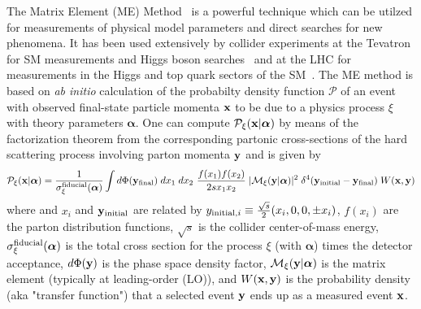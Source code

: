 The Matrix Element (ME)
Method~\cite{Kondo:1988yd,Fiedler:2010sg,2011arXiv1101.2259V,Elahi:2017ppe}
is a powerful technique which can be utilzed for measurements of
physical model parameters and direct searches for new phenomena. It
has been used extensively by collider experiments at the Tevatron for
SM measurements and Higgs boson
searches~\cite{Abazov:2004cs,Abulencia:2006ry,Aaltonen:2008mv,Aaltonen:2010cm,Abazov:2009ii,Aaltonen:2009jj}
and at the LHC for measurements in the Higgs and top quark sectors of
the
SM~\cite{Chatrchyan:2012xdj,Chatrchyan:2013mxa,Aad:2014eva,Khachatryan:2015tzo,
Khachatryan:2015ila,Aad:2015gra,Aad:2015upn}. The ME method is based
on \emph{ab initio} calculation of the probabilty density function
$\mathcal{P}$ of an event with observed final-state particle momenta
${\bf x}$ to be due to a physics process $\xi$ with theory parameters
$\boldsymbol\alpha$. One can compute $\mathcal{P}_{\xi}({\bf
x}|{\boldsymbol\alpha})$ by means of the factorization theorem from
the corresponding partonic cross-sections of the hard scattering
process involving parton momenta ${\bf y}$ and is given by 
\begin{equation}
\mathcal{P}_{\xi}({\bf x}|{\boldsymbol\alpha}) = \frac{1}{\sigma^{\rm fiducial}_{\xi}(\boldsymbol\alpha)} \int d\Phi ({\bf y}_{\rm final}) \; dx_1 \; dx_2~\frac{f(x_1)f(x_2)}{2s x_1 x_2} \; |\mathcal{M}_{\xi}({\bf y}|\boldsymbol\alpha)|^2 \; \delta^{4}({\bf y}_{\rm initial}-{\bf y}_{\rm final}) \; W({\bf x}, {\bf y})
\label{eqn:MEProb}
\end{equation}
where and $x_i$ and ${\bf y}_{{\rm initial}}$ are related by $y_{{\rm
initial},i}\equiv \frac{\sqrt{s}}{2}(x_i,0,0,\pm x_i)$, $f(x_i)$ are
the parton distribution functions, $\sqrt{s}$ is the collider
center-of-mass energy, $\sigma^{\rm
fiducial}_{\xi}(\boldsymbol\alpha)$ is the total cross section for the
process $\xi$ (with $\boldsymbol\alpha$) times the detector
acceptance, $d\Phi({\bf y})$ is the phase space density factor,
$\mathcal{M}_{\xi}({\bf y}|\boldsymbol\alpha)$ is the matrix element
(typically at leading-order (LO)), and $W({\bf x}, {\bf y})$ is the
probability density (aka "transfer function") that a selected event
${\bf y}$ ends up as a measured event ${\bf x}$.

